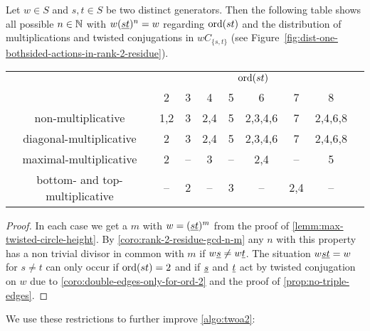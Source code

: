 \begin{coro}
	Let $w \in S$ and $s,t \in S$ be two distinct generators. Then the following table shows all possible $n \in \mathbb{N}$ with $w(\underline{s} \underline{t})^n = w$ regarding $\operatorname{ord}(st)$ and the distribution of multiplications and twisted conjugations in $wC_{\{s,t\}}$ (see Figure~\ref{fig:dist-one-bothsided-actions-in-rank-2-residue}).

	\begin{center}
		\begin{tabular}{c|ccccccc|c}
													& \multicolumn{7}{c|}{$\operatorname{ord}(st)$} \\
													& 2 & 3 & 4 & 5 & 6 & 7 & 8 \\
			\hline
			\textrm{non-multiplicative}				& 1,2 & 3 & 2,4 & 5 & 2,3,4,6 & 7 & 2,4,6,8 \\
			\textrm{diagonal-multiplicative}		& 2 & 3 & 2,4 & 5 & 2,3,4,6 & 7 & 2,4,6,8 \\
			\textrm{maximal-multiplicative}			& 2 & -- & 3 & -- & 2,4 & -- & 5 \\
			\textrm{bottom- and top-multiplicative}	& -- & 2 & -- & 3 & -- & 2,4 & -- \\
		\end{tabular}		
	\end{center}

	\begin{proof}
		In each case we get a $m$ with $w = (\underline{s} \underline{t})^m$ from the proof of \ref{lemm:max-twisted-circle-height}. By \ref{coro:rank-2-residue-gcd-n-m} any $n$ with this property has a non trivial divisor in common with $m$ if $w \underline{s} \neq w \underline{t}$. The situation $w \underline{s} \underline{t} = w$ for $s \neq t$ can only occur if $\operatorname{ord}(st) = 2$ and if $\underline{s}$ and $\underline{t}$ act by twisted conjugation on $w$ due to \ref{coro:double-edges-only-for-ord-2} and the proof of \ref{prop:no-triple-edges}.
	\end{proof}
\end{coro}

We use these restrictions to further improve \ref{algo:twoa2}:

